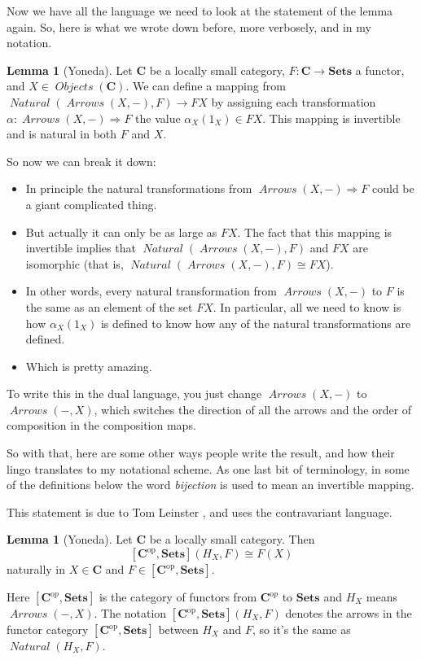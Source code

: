 \documentclass[12pt]{article}
\theoremstyle{definition}
\newtheorem{lemma}[thm]{Lemma}
\theoremstyle{definition}
\theoremstyle{definition}
\numberwithin{equation}{section}
\newcommand{\h}{H}                      %
\newcommand{\op}{\mathrm{op}}           %
\newcommand{\ftrcat}[2]{[#1,#2]}                %
\newcommand{\pshf}[1]{\ftrcat{#1^\op}{\Set}}    %
\newcommand{\cat}[1]{\mathbf{#1}}      %
\newcommand{\fcat}[1]{{\mathbf {#1}}}    %
\newcommand{\CC}{\cat{C}}
\newcommand{\CCop}{\cat{C}^{\mathrm op}}
\DeclareMathOperator{\Arrows}{\mathit{Arrows}}
\DeclareMathOperator{\Objects}{\mathit{Objects}}
\DeclareMathOperator{\Nat}{\mathit{Natural}}
\def\objc{\Objects(\cat{C})}
\newcommand{\Set}{\fcat{Sets}}           %
\newcommand{\iso}{\cong}                %
\newcommand{\fto}{\Rightarrow}
\def\pg{\bigskip\goodbreak\ni}
\def\ni{\goodbreak\noindent}
\begin{document}
Now we have all the language we need to look at the statement of the lemma again. So, here
is what we wrote down before, more verbosely, and in my notation.

\begin{lemma}[Yoneda]\label{yoneda} Let $\CC$ be a locally small category, $F:\CC \to
\Set$ a functor, and $X \in \objc$. We can define a mapping from $\Nat(\Arrows(X, -),F)
\to FX$ by assigning each transformation $\alpha: \Arrows(X, -) \fto F$ the value
$\alpha_X(1_X) \in FX$. This mapping is invertible and is natural in both $F$ and $X$.
\end{lemma}
\ni
So now we can break it down:
\begin{itemize}
\item In principle the natural transformations from $\Arrows(X, -) \fto F$ could be a
giant complicated thing.
\item But actually it can only be as large as $FX$. The fact that this mapping is
invertible implies that $\Nat(\Arrows(X, -),F)$ and  $FX$ are isomorphic (that is,
$\Nat(\Arrows(X, -),F) \iso FX$).
\item In other words, every natural transformation from $\Arrows(X, -)$ to $F$ is the same
as an element of the set $FX$. In particular, all we need to know is how $\alpha_X(1_X)$
is defined to know how any of the natural transformations are defined.
\item Which is pretty amazing.
\end{itemize}
To write this in the dual language, you just change $\Arrows(X, -)$ to $\Arrows(-, X)$,
which switches the direction of all the arrows and the order of composition in the
composition maps.

So with that, here are some other ways people write the result, and how their lingo
translates to my notational scheme. As one last bit of terminology, in some of the
definitions below the word {\it bijection} is used to mean an invertible mapping.

\pg
This statement is due to Tom Leinster \cite{Leinster}, and uses the contravariant
language.

\begin{lemma}[Yoneda]   
\label{yoneda-leinster}
Let $\CC$ be a locally small category.  Then
%
$$
\pshf{\CC}(\h_X, F)
\iso
F(X)
$$
%
naturally in $X \in \CC$ and $F \in \pshf{\CC}$.  
\end{lemma}
\ni
Here $[\CCop, \Set]$ is the category of functors from $\CCop$ to $\Set$ and 
$\h_X$ means $\Arrows(-,X)$.
The notation $\pshf{\CC}(\h_X, F)$ denotes the arrows in the functor
category $\pshf{\CC}$ between $\h_X$ and $F$, so it's the same as $\Nat(\h_X, F)$.
\end{document}
